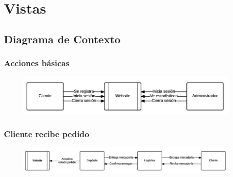 \section{Vistas}

  \subsection{Diagrama de Contexto}
    
    \subsubsection{Acciones básicas}
    \begin{figure}[H]
      \includegraphics[width=\linewidth]{images/acciones-basicas.png}
    \end{figure}

    \clearpage
    \subsubsection{Cliente recibe pedido}
    \begin{figure}[H]
      \includegraphics[width=\linewidth]{images/cliente-recibe-pedido.png}
    \end{figure}

    \clearpage
